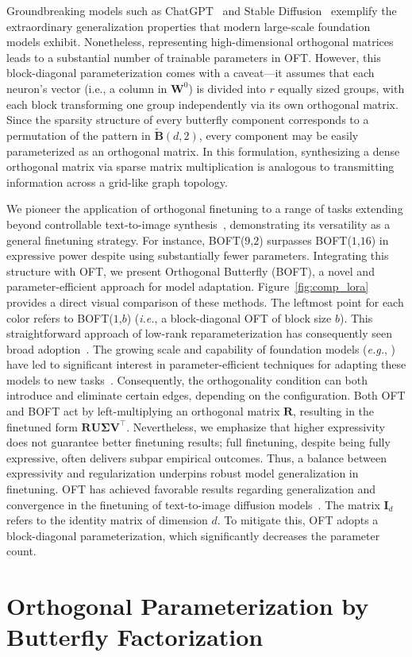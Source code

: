 Groundbreaking models such as ChatGPT~\cite{brown2020language,chen2021evaluating} and Stable Diffusion~\cite{rombach2022high} exemplify the extraordinary generalization properties that modern large-scale foundation models exhibit. Nonetheless, representing high-dimensional orthogonal matrices leads to a substantial number of trainable parameters in OFT. However, this block-diagonal parameterization comes with a caveat—it assumes that each neuron's vector (i.e., a column in $\bm{W}^0$) is divided into $r$ equally sized groups, with each block transforming one group independently via its own orthogonal matrix. Since the sparsity structure of every butterfly component corresponds to a permutation of the pattern in $\tilde{\bm{B}}(d,2)$, every component may be easily parameterized as an orthogonal matrix. In this formulation, synthesizing a dense orthogonal matrix via sparse matrix multiplication is analogous to transmitting information across a grid-like graph topology. \item We pioneer the application of orthogonal finetuning to a range of tasks extending beyond controllable text-to-image synthesis~\cite{qiu2023controlling}, demonstrating its versatility as a general finetuning strategy. For instance, BOFT($9$,$2$) surpasses BOFT($1$,$16$) in expressive power despite using substantially fewer parameters. Integrating this structure with OFT, we present Orthogonal Butterfly (BOFT), a novel and parameter-efficient approach for model adaptation. Figure~\ref{fig:comp_lora} provides a direct visual comparison of these methods. The leftmost point for each color refers to BOFT($1$,$b$) (\emph{i.e.}, a block-diagonal OFT of block size $b$). This straightforward approach of low-rank reparameterization has consequently seen broad adoption~\cite{dettmers2023qlora,zi2023delta,chavan2023one}. The growing scale and capability of foundation models (\emph{e.g.}, \cite{brown2020language,radford2021learning,rombach2022high,kirillov2023segment}) have led to significant interest in parameter-efficient techniques for adapting these models to new tasks~\cite{treviso2023efficient,ding2023parameter,lialin2023scaling}. Consequently, the orthogonality condition can both introduce and eliminate certain edges, depending on the configuration. Both OFT and BOFT act by left-multiplying an orthogonal matrix $\bm{R}$, resulting in the finetuned form $\bm{R}\bm{U}\bm{\Sigma}\bm{V}^\top$. Nevertheless, we emphasize that higher expressivity does not guarantee better finetuning results; full finetuning, despite being fully expressive, often delivers subpar empirical outcomes. Thus, a balance between expressivity and regularization underpins robust model generalization in finetuning. OFT has achieved favorable results regarding generalization and convergence in the finetuning of text-to-image diffusion models~\cite{qiu2023controlling}. The matrix $\bm{I}_d$ refers to the identity matrix of dimension $d$. To mitigate this, OFT adopts a block-diagonal parameterization, which significantly decreases the parameter count. \section{Orthogonal Parameterization by Butterfly Factorization}

